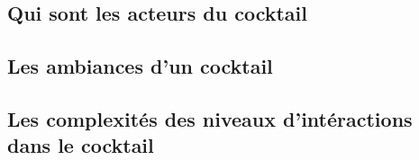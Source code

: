 


\subsection{Qui sont les acteurs du cocktail}


\subsection{Les ambiances d'un cocktail}




\subsection{Les complexités des niveaux d'intéractions dans le cocktail}



